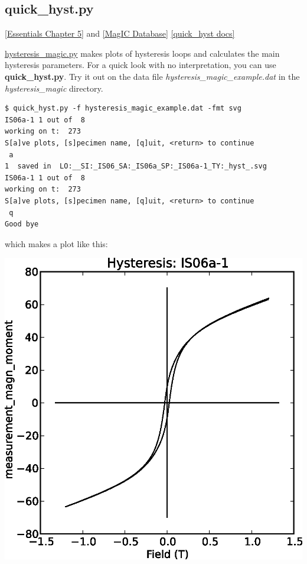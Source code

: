 \documentclass[11pt]{book}
\begin{document}
{{%

\subsection{quick\_hyst.py}
\href{http://earthref.org/MAGIC/books/Tauxe/Essentials/WebBook3ch5.html#ch5}{[Essentials Chapter 5]} and \href{#MagICDatabase}{[MagIC Database]}
\href{https://github.com/PmagPy/PmagPy/blob/master/programs/quick_hyst.py}{[quick\_hyst docs]}

\href{#hysteresis_magic.py}{hysteresis\_magic.py} makes plots of hysteresis loops and calculates the main hysteresis parameters.  For a quick look with no interpretation, you can use {\bf quick\_hyst.py}.   Try it out on the data file {\it hysteresis\_magic\_example.dat} in the {\it hysteresis\_magic} directory.

\begin{verbatim}
$ quick_hyst.py -f hysteresis_magic_example.dat -fmt svg
IS06a-1 1 out of  8
working on t:  273
S[a]ve plots, [s]pecimen name, [q]uit, <return> to continue
 a
1  saved in  LO:__SI:_IS06_SA:_IS06a_SP:_IS06a-1_TY:_hyst_.svg
IS06a-1 1 out of  8
working on t:  273
S[a]ve plots, [s]pecimen name, [q]uit, <return> to continue
 q
Good bye
\end{verbatim}

which makes a plot like this:

\includegraphics[width=12 cm]{EPSfiles/quick_hyst.eps}

}}
\end{document}
